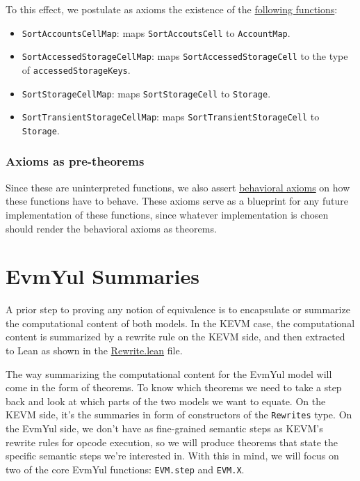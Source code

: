 To this effect, we postulate as axioms the existence of the
\href{https://runtimeverification.github.io/evm-equivalence/docs/EvmEquivalence/Interfaces/Axioms.html}{following
  functions}:

\begin{itemize}
\item \texttt{SortAccountsCellMap}: maps \texttt{SortAccoutsCell} to
  \texttt{AccountMap}.
\item \texttt{SortAccessedStorageCellMap}: maps \texttt{SortAccessedStorageCell}
  to the type of \texttt{accessedStorageKeys}.
\item \texttt{SortStorageCellMap}: maps \texttt{SortStorageCell} to
  \texttt{Storage}.
\item \texttt{SortTransientStorageCellMap}: maps
  \texttt{SortTransientStorageCell} to \texttt{Storage}.
\end{itemize}

\subsection{Axioms as pre-theorems}

Since these are uninterpreted functions, we also assert
\href{https://runtimeverification.github.io/evm-equivalence/docs/EvmEquivalence/StateMap.html#Axioms.findAccountInAccountCellMap}{behavioral
  axioms} on how these functions have to behave. These axioms serve as a
blueprint for any future implementation of these functions, since whatever
implementation is chosen should render the behavioral axioms as theorems.


\chapter{EvmYul Summaries}\label{chap:EvmYulSummaries}

A prior step to proving any notion of equivalence is to encapsulate or summarize
the computational content of both models. In the KEVM case, the computational
content is summarized by a rewrite rule on the KEVM side, and then extracted to
Lean as shown in the
\href{https://runtimeverification.github.io/evm-equivalence/docs/EvmEquivalence/KEVM2Lean/Rewrite.html}{Rewrite.lean}
file.

The way summarizing the computational content for the EvmYul model will come in
the form of theorems. To know which theorems we need to take a step back and
look at which parts of the two models we want to equate. On the KEVM side, it's
the summaries in form of constructors of the \texttt{Rewrites} type.
On the EvmYul side, we don't have as fine-grained semantic steps as KEVM's
rewrite rules for opcode execution, so we will produce theorems that state the
specific semantic steps we're interested in. With this in
mind, we will focus on two of the core EvmYul functions: \texttt{EVM.step} and
\texttt{EVM.X}.

